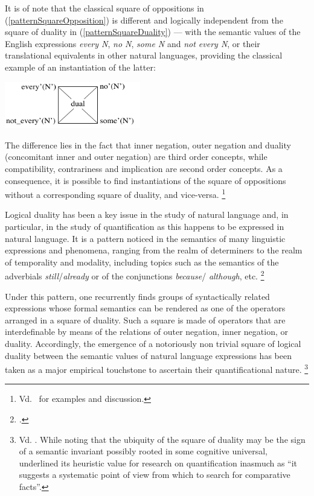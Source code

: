 \documentclass[output=paper
,modfonts
,nonflat]{langsci/langscibook}
\begin{document}
It is of note that 
the classical square of oppositions in (\ref{patternSquareOpposition})
is different and logically independent from
the square of duality in (\ref{patternSquareDuality}) --- with the semantic values of the English 
expressions \emph{every N}, \emph{no N},
\emph{some N} and \emph{not every N}, or their translational equivalents in
other natural languages, providing the classical example of an instantiation
of the latter:

\begin{exe}
\ex
\end{exe}
\vspace{-7mm}
\centerline{\hspace{0 mm}\includegraphics[width=14pc]{figures/classicalSquareDuality.pdf}}



The difference lies in the fact that inner negation, outer
negation and duality (concomitant inner and outer negation) are third order concepts, while compatibility, contrariness and
implication are second order concepts. As a consequence, it is possible
to find instantiations of the square of oppositions without a
corresponding square of duality, and vice-versa.%
\footnote{
Vd.~\citep{Lobner1987} for examples and discussion.
}


Logical duality has been a key issue in the study of natural language 
and, in particular, in the study of quantification as this happens to
be expressed in natural language.  It is a pattern noticed in the
semantics  of many linguistic expressions and phenomena, ranging from
the realm  of determiners to the realm of temporality and modality,
including topics  such as the semantics of the adverbials {\em
still}/\emph{already} or of the conjunctions  \emph{because}/{\em
although}, etc.%
\footnote{
\citep{Lobner1987, Lobner1989, Lobner1999, terMeulen1988, Konig1991, Smessaert1997}.
}

Under this pattern, one recurrently finds groups of syntactically related 
expressions whose formal semantics can be rendered as one of the operators
arranged in a square of duality. Such a square is made of operators that 
are interdefinable by means of the relations of outer negation, inner
negation, or duality.
Accordingly, 
the emergence of a notoriously non trivial square of logical duality
between the semantic values of natural language expressions has been taken 
as a major empirical touchstone to ascertain their quantificational nature.%
\footnote{
Vd. \citep{Lobner1987,vanBenthem1991}. While noting that the ubiquity of the square of duality 
may be the sign of a semantic invariant possibly rooted in some cognitive universal,  
\citep[p.23]{vanBenthem1991} underlined its heuristic value for research
on quantification inasmuch as ``it suggests a systematic point of view from
which to search for comparative facts''.
}
\end{document}
